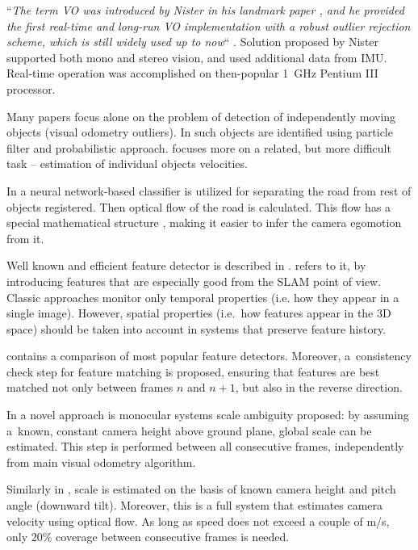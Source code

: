 ``\textit{The term VO was introduced by Nister in his landmark paper \cite{visual_odometry}, and he provided the first real-time and long-run VO implementation with a robust outlier rejection scheme, which is still widely used up to now}`` \cite{a_stereo_visual}. Solution proposed by Nister supported both mono and stereo vision, and used additional data from IMU. Real-time operation was accomplished on then-popular 1~GHz Pentium III processor.

Many papers focus alone on the problem of detection of independently moving objects (visual odometry outliers). In \cite{fast_monocular} such objects are identified using particle filter and probabilistic approach. \cite{costeira1998multibody} focuses more on a related, but more difficult task -- estimation of individual objects velocities. 

In \cite{vehicle_egomotion} a neural network-based classifier is utilized for separating the road from rest of objects registered. Then optical flow of the road is calculated. This flow has a special mathematical structure \cite{recovery_of_egomotion}, making it easier to infer the camera egomotion from it.

Well known and efficient feature detector is described in \cite{shi1994good}. \cite{spatiotemporal} refers to it, by introducing features that are especially good from the SLAM point of view. Classic approaches monitor only temporal properties (i.e. how they appear in a single image). However, spatial properties (i.e.~how features appear in the 3D space) should be taken into account in systems that preserve feature history.

\cite{a_stereo_visual} contains a comparison of most popular feature detectors. Moreover, a~consistency check step for feature matching is proposed, ensuring that features are best matched not only between frames $n$ and $n+1$, but also in the reverse direction.

In \cite{robust_scale} a novel approach is monocular systems scale ambiguity proposed: by assuming a~known, constant camera height above ground plane, global scale can be estimated. This step is performed between all consecutive frames, independently from main visual odometry algorithm.

Similarly in \cite{a_kalman}, scale is estimated on the basis of known camera height and pitch angle (downward tilt). Moreover, this is a full system that estimates camera velocity using optical flow. As long as speed does not exceed a couple of m/s, only 20\% coverage between consecutive frames is needed.


